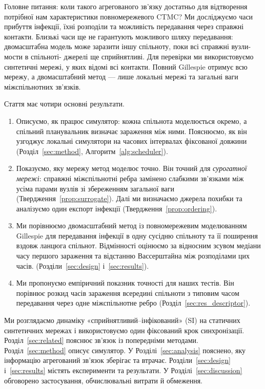 \documentclass[a4paper,fleqn]{cas-sc}
\begin{document}
Головне питання: коли такого агрегованого зв'язку достатньо для відтворення потрібної нам характеристики повномережевого CTMC? Ми досліджуємо часи прибуття інфекції, їхні розподіли та можливість передавання через справжні контакти. Близькі часи ще не гарантують можливого шляху
передавання: двомасштабна модель може заразити іншу спільноту, поки всі справжні вузли-мости в спільноті-
джерелі ще сприйнятливі. Для перевірки ми використовуємо синтетичні мережі, у яких відомі всі контакти.
Повний Gillespie отримує всю мережу, а двомасштабний метод — лише локальні мережі та загальні ваги
міжспільнотних зв’язків.

Стаття має чотири основні результати.
\begin{enumerate}
\item Описуємо, як працює симулятор: кожна спільнота моделюється окремо, а спільний планувальник визначає
зараження між ними. Пояснюємо, як він узгоджує локальні симулятори на часових інтервалах фіксованої довжини (Розділ~\ref{sec:method}, Алгоритм~\ref{alg:scheduler}).
\item Показуємо, яку мережу метод моделює точно. Він точний для \emph{сурогатної мережі}: справжні міжспільнотні ребра замінено слабкими зв'язками між усіма парами вузлів зі збереженням загальної ваги (Твердження~\ref{prop:surrogate}). Далі ми визначаємо джерела похибки та аналізуємо один експорт інфекції (Твердження~\ref{prop:ordering}).
\item Ми порівнюємо двомасштабний метод із повномережевим моделюванням Gillespie для передавання інфекції в одну сусідню спільноту та її поширення вздовж ланцюга спільнот. Відмінності оцінюємо за відносним зсувом медіани часу першого зараження та відстанню Вассерштайна між розподілами цих часів.  (Розділи~\ref{sec:design} і~\ref*{sec:results}).
\item Ми пропонуємо емпіричний показник точності для наших тестів. Він порівнює розкид часів зараження всередині спільноти з типовим часом передавання через одне міжспільнотне ребро (Розділ~\ref*{sec:res_descriptor}).
\end{enumerate}

Ми розглядаємо динаміку «сприйнятливий--інфікований» (SI) на статичних синтетичних мережах і використовуємо один фіксований крок синхронізації. Розділ~\ref{sec:related} пояснює зв'язок із попередніми методами. Розділ~\ref{sec:method} описує симулятор. У Розділі~\ref{sec:analysis} пояснено, яку інформацію агрегований зв'язок зберігає та втрачає. Розділи~\ref{sec:design} і~\ref*{sec:results} містять експерименти та результати. У Розділі~\ref*{sec:discussion} обговорено застосування, обчислювальні витрати й обмеження.
\end{document}
